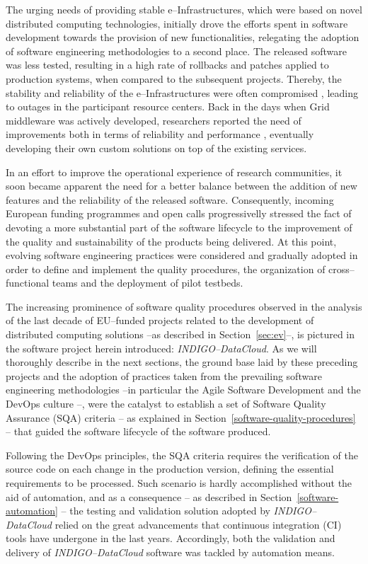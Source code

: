 The urging needs of providing stable e--Infrastructures, which were based on novel distributed computing technologies, 
initially drove the efforts spent in software development towards the provision of new functionalities, relegating the 
adoption of software engineering methodologies to a second place. The released software was less tested, resulting in 
a high rate of rollbacks and patches applied to production systems, when compared to the subsequent projects. 
Thereby, the stability and reliability of the e--Infrastructures were often compromised \cite{lingrand-egee}, leading 
to outages in the participant resource centers. Back in the days when Grid middleware was actively developed, 
researchers reported the need of improvements both in terms of reliability and performance \cite{campana-atlas}, 
eventually developing their own custom solutions \cite{kindermann}\cite{mendez-lorenzo} on top of the existing services.

In an effort to improve the operational experience of research communities, it soon became apparent the need for a better 
balance between the addition of new features and the reliability of the released software. Consequently, incoming European 
funding programmes and open calls progressivelly stressed the fact of devoting a more substantial part of the software 
lifecycle to the improvement of the quality and sustainability of the products being delivered. At this point,
evolving software engineering practices were considered and gradually adopted in order to define and implement the quality
procedures, the organization of cross--functional teams and the deployment of pilot testbeds.

The increasing prominence of software quality procedures observed in the analysis of the last decade of EU--funded
projects related to the development of distributed computing solutions --as described in Section~\ref{sec:ev}--, is 
pictured in the software project herein introduced: {\sl INDIGO--DataCloud}. As we will thoroughly describe in the next
sections, the ground base laid by these preceding projects and the adoption of practices taken from the prevailing 
software engineering methodologies --in particular the Agile Software Development \cite{agile-manifesto} and the DevOps
culture \cite{zhu}--, were the catalyst to establish a set of Software Quality Assurance (SQA) criteria 
-- as explained in Section~\ref{software-quality-procedures} -- that guided the software lifecycle of the software 
produced.

Following the DevOps principles, the SQA criteria requires the verification of the source code on each change in the 
production version, defining the essential requirements to be processed. Such scenario is hardly accomplished without
the aid of automation, and as a consequence -- as described in Section~\ref{software-automation} -- the testing and 
validation solution adopted by {\sl INDIGO--DataCloud} relied on the great advancements that continuous integration 
(CI) tools have undergone in the last years. Accordingly, both the validation and delivery of {\sl INDIGO--DataCloud} 
software was tackled by automation means.

